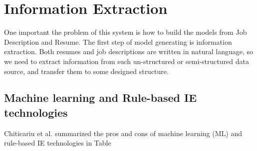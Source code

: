 \chapter{Information Extraction}


One important the problem of this system is how to build the models from Job Description and Resume. The first step of model generating is information extraction. Both resumes and job descriptions are written in natural language, so we need to extract information from such un-structured or semi-structured data source, and transfer them to some designed structure.

\section{Machine learning and Rule-based IE technologies}

Chiticariu et al. \cite{chiticariu2013rule}summarized the pros and cons of machine learning (ML) and rule-based IE technologies in Table

